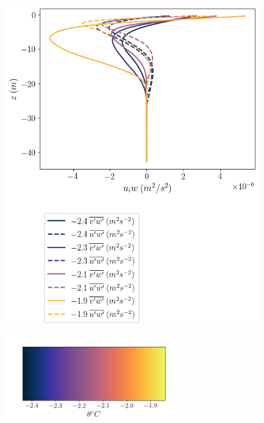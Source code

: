 \documentclass[draft]{agujournal2019}
\begin{document}
\begin{figure}[h!]
    \begin{minipage}{0.5\textwidth}
        \includegraphics[trim={0 7.5cm 0 0},clip,width=\textwidth]{Figures/momflux_cmp_dT_44h_tav12_z_profile.png}
        \centering \includegraphics[width=0.7\textwidth,trim={1cm 0cm 1cm 5cm}, clip]{Figures/colorbar_thermal_driving.png}
    \end{minipage}%
    \begin{minipage}{0.5\textwidth}

\end{minipage}
\end{figure}
\end{document}
